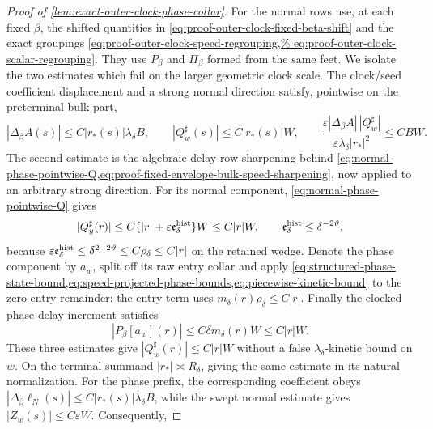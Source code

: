\begin{proof}[Proof of
\cref{lem:exact-outer-clock-phase-collar}]
For the normal rows use, at each fixed \(\beta\), the shifted quantities
in \cref{eq:proof-outer-clock-fixed-beta-shift} and the exact groupings
\cref{eq:proof-outer-clock-speed-regrouping,%
eq:proof-outer-clock-scalar-regrouping}.  They use \(P_\beta\) and
\(\Pi_\beta\) formed from the same feet.  We isolate the two estimates
which fail on the larger geometric clock scale.  The clock/seed
coefficient displacement and a strong normal direction satisfy, pointwise
on the preterminal bulk part,
\begin{equation}
 |\Delta_\beta A(s)|
      \le C|r_*(s)|\lambda_\delta B,
 \qquad |Q_w^\sharp(s)|\le C|r_*(s)|W,
 \qquad
 \frac{\varepsilon|\Delta_\beta A|\,|Q_w^\sharp|}
      {\varepsilon\lambda_\delta|r_*|^2}
 \le CBW.                                      \label{eq:proof-outer-clock-hostile-bulk-cross}
\end{equation}
The second estimate is the algebraic delay-row sharpening behind
\cref{eq:normal-phase-pointwise-Q,eq:proof-fixed-envelope-bulk-speed-sharpening},
now applied to an arbitrary strong direction.  For its normal component,
\cref{eq:normal-phase-pointwise-Q} gives
\begin{equation}
 |Q_y^\sharp(r)|
 \le C\{|r|+\varepsilon\mathfrak e_\delta^{\rm hist}\}W
 \le C|r|W,\qquad
 \mathfrak e_\delta^{\rm hist}\le\delta^{-2\vartheta},
                                                        \label{eq:proof-outer-clock-arbitrary-normal-Q}
\end{equation}
because
\(\varepsilon\mathfrak e_\delta^{\rm hist}
 \le\delta^{2-2\vartheta}\le C\rho_\delta\le C|r|\)
on the retained wedge.  Denote the phase component by \(a_w\), split off
its raw entry
collar and apply
\cref{eq:structured-phase-state-bound,eq:speed-projected-phase-bounds,eq:piecewise-kinetic-bound}
to the zero-entry remainder; the entry term uses
\(m_\delta(r)\rho_\delta\le C|r|\).  Finally the clocked phase-delay
increment satisfies
\begin{equation}
 |P_\beta[a_w](r)|\le C\delta m_\delta(r)W
       \le C|r|W.                                \label{eq:proof-outer-clock-arbitrary-phase-P}
\end{equation}
These three estimates give \(|Q_w^\sharp(r)|\le C|r|W\) without a false
\(\lambda_\delta\)-kinetic bound on \(w\).  On the terminal summand
\(|r_*|\asymp R_\delta\), giving the same estimate in its natural
normalization.
For the phase prefix, the corresponding coefficient obeys
\(|\Delta_\beta\ell_N(s)|\le C|r_*(s)|\lambda_\delta B\), while the swept
normal estimate gives \(|Z_w(s)|\le C\varepsilon W\).  Consequently,

\end{proof}
